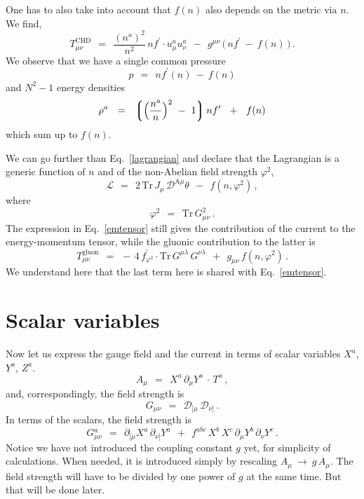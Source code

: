 \documentclass[epsfig,12pt]{article}
\def\beq{\begin{equation}}
\def\eeq{\end{equation}}
\newcommand{\p}{\partial}
\newcommand{\md}{\mathcal{D}}
\newcommand{\ml}{\mathcal{L}}
\newcommand{\lgr}{\left\lgroup}
\newcommand{\rgr}{\right\rgroup}
\newcommand{\Tr}{\text{Tr}}
\begin{document}
	One has to also take into account that $ f(n) $ also depends on the metric via $ n $.
	We find,
\beq
\label{emtensor}
	T_{\mu\nu}^\text{CHD}    ~~=~~    \frac{(n^a)^2}{n^2}\, n f^\prime \cdot u_\mu^a u_\nu^a  ~~-~~
					  g^{\mu\nu}\, \big(\, n f^\prime ~-~ f(n) \,\big)\,.
\eeq
	We observe that we have a single common pressure
\beq
	p    ~~=~~    n f^\prime(n) ~-~ f(n)
\eeq
	and $ N^2 - 1 $ energy densities
\beq
	\rho^a    ~~=~~    \lgr \Big( \frac{n^a}{n} \Big)^2 ~-~ 1 \rgr n f^\prime  ~~+~~ f(n)
\eeq
	which sum up to $ f(n) $.

        We can go further than Eq.~\eqref{lagrangian} and declare that the Lagrangian
        is a generic function of $ n $ and of the non-Abelian field strength $ \varphi^2 $,
\beq
\label{generic}
        \ml    ~~=~~    2\, \Tr\, J_\mu\,  \md^{\text{A}\mu} \theta   ~~-~~  f(n, \varphi^2)\,,
\eeq
        where
\beq
        \varphi^2    ~~=~~    \Tr\, G_{\mu\nu}^2\,.
\eeq
	The expression in Eq.~\eqref{emtensor} still gives the contribution of the current to the energy-momentum tensor,
	while the gluonic contribution to the latter is
\beq
\label{T-gluon}
	T_{\mu\nu}^\text{gluon}    ~~=~~    -\, 4\, f^\prime_{\varphi^2} \cdot \Tr\, G^{\mu\lambda}\, G^{\nu\lambda}
				   ~~+~~    g_{\mu\nu}\, f(n, \varphi^2)\,.
\eeq
	We understand here that the last term here is shared with Eq.~\eqref{emtensor}.




\section{Scalar variables}

	Now let us express the gauge field and the current in terms of scalar variables $ X^a $, $ Y^a $, $ Z^a $.
\beq
\label{defA}
        A_\mu    ~~=~~    X^a\, \p_\mu Y^a\, \cdot\, T^a\,,
\eeq
	and, correspondingly, the field strength is
\beq
\label{defG}
	G_{\mu\nu}    ~~=~~    \md_{[\mu}\, \md_{\nu]}\,.
\eeq
	In terms of the scalars, the field strength is
\beq
\label{Ga}
	G{}_{\mu\nu}^a    ~~=~~    \p_{[\mu} X^a\, \p_{\nu]} Y^a  ~~+~~
				   f^{abc}\, X^b\, X^c\, \p_\mu Y^b\, \p_\nu Y^c\,.
\eeq
        Notice we have not introduced the coupling constant $ g $ yet, for simplicity of calculations.
	When needed, it is introduced simply by rescaling $ A_\mu ~\to~ g\, A_\mu $.
	The field strength will have to be divided by one power of $ g $ at the same time.
	But that will be done later.
\end{document}
